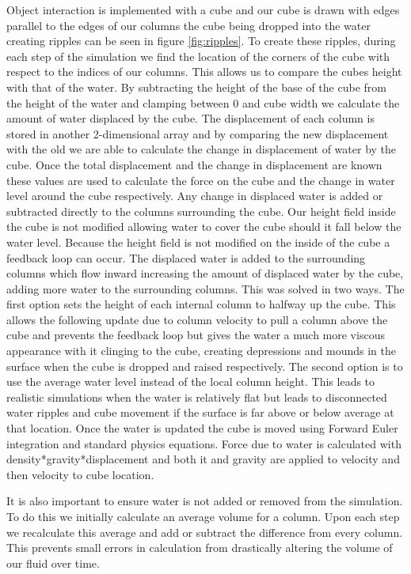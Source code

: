 \documentclass[11pt]{article}
\begin{document}
Object interaction is implemented with a cube and our cube is drawn with edges 
parallel to the edges of our columns the cube being dropped into the water 
creating ripples can be seen in figure \ref{fig:ripples}.  To create these 
ripples, during each step of 
the simulation we 
find the location of the corners of the cube with respect to the indices of our 
columns.  This allows us to compare the cubes height with that of the water.  
By subtracting the height of the base of the cube from the height of the water 
and clamping between 0 and cube width we calculate the amount of water 
displaced by the cube.  The displacement of each column is stored in another 
2-dimensional array and by comparing the new displacement with the old we are 
able to calculate the change in displacement of water by the cube.  Once the 
total displacement and the change in displacement are known these values are 
used to calculate the force on the cube and the change in water level around 
the cube respectively.  Any change in displaced water is added or subtracted 
directly to the columns surrounding the cube.  Our height field inside the cube 
is not modified allowing water to cover the cube should it fall below the water 
level.  Because the height field is not modified on the inside of the cube a 
feedback loop can occur.  The displaced water is added to the surrounding 
columns which flow inward increasing the amount of displaced water by the cube, 
adding more water to the surrounding columns.  This was solved in two ways.  
The first option sets the height of each internal column to halfway up the 
cube.  This allows the following update due to column velocity to pull a column 
above the cube and prevents the feedback loop but gives the water a much more 
viscous appearance with it clinging to the cube, creating depressions and 
mounds in the surface when the cube is dropped and raised respectively.  The 
second option is to use the average water level instead of the local column 
height.  This leads to realistic simulations when the water is relatively flat 
but leads to disconnected water ripples and cube movement if the surface is far 
above or below average at that location.  Once the water is updated the cube is 
moved using Forward Euler integration and standard physics equations.  Force 
due to water is calculated with density*gravity*displacement and both it and 
gravity are applied to velocity and then velocity to cube location.

It is also important to ensure water is not added or removed from the simulation.  To do this we initially calculate an average volume for a column.  Upon each step we recalculate this average and add or subtract the difference from every column.  This prevents small errors in calculation from drastically altering the volume of our fluid over time.
\end{document}
